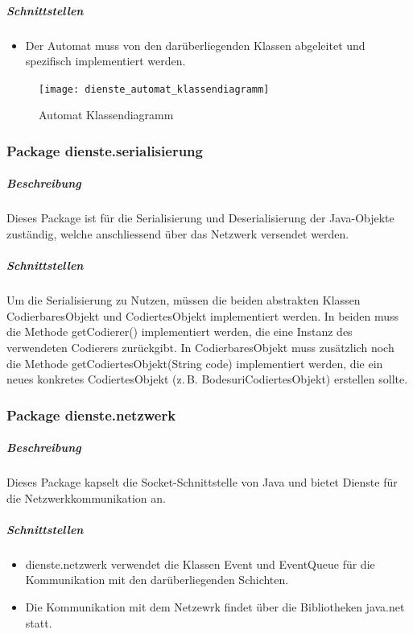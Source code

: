 \documentclass[12pt,halfparskip]{scrartcl}
\begin{document}
\subparagraph{Schnittstellen} %
\label{ssub:schnittstellen}
\begin{itemize}
	\item Der Automat muss von den darüberliegenden Klassen abgeleitet und spezifisch implementiert werden.
\end{itemize}	

\begin{figure}[h]
	\centering
	\texttt{[image: dienste\_automat\_klassendiagramm]}
	\caption{Automat Klassendiagramm}
	\label{fig:dienste_serialisierung}
\end{figure}


\clearpage
\subsubsection{Package dienste.serialisierung} %
\label{ssub:package_dienste_serialisierung}
\subparagraph{Beschreibung}
Dieses Package ist für die Serialisierung und Deserialisierung der Java-Objekte zuständig, welche anschliessend über das Netzwerk versendet werden.

\subparagraph{Schnittstellen} %
\label{ssub:schnittstellen}
Um die Serialisierung zu Nutzen, müssen die beiden abstrakten Klassen CodierbaresObjekt und CodiertesObjekt implementiert werden. In beiden muss die Methode getCodierer() implementiert werden, die eine Instanz des verwendeten Codierers zurückgibt. In CodierbaresObjekt muss zusätzlich noch die Methode getCodiertesObjekt(String code) implementiert werden, die ein neues konkretes CodiertesObjekt (z.\,B. BodesuriCodiertesObjekt) erstellen sollte.

\clearpage
\subsubsection{Package dienste.netzwerk} %
\label{ssub:package_dienste_netzwerk}
\subparagraph{Beschreibung}
Dieses Package kapselt die Socket-Schnittstelle von Java und bietet Dienste für die Netzwerkkommunikation an.

\subparagraph{Schnittstellen} %
\label{ssub:schnittstellen}
\begin{itemize}
	\item dienste.netzwerk verwendet die Klassen Event und EventQueue für die Kommunikation mit den darüberliegenden Schichten.
	\item Die Kommunikation mit dem Netzewrk findet über die Bibliotheken java.net statt.
\end{itemize}
\end{document}
